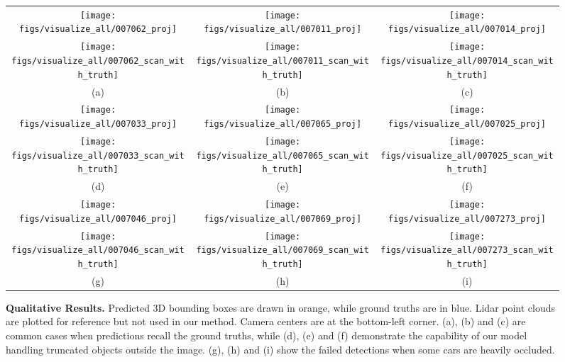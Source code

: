 \begin{figure*}[t] 
	\centering
	\scriptsize
	\begin{tabular}{c@{\hspace{0.14cm}}c@{\hspace{0.14cm}}c}
		\texttt{[image: figs/visualize\_all/007062\_proj]} &
		\texttt{[image: figs/visualize\_all/007011\_proj]} &
		\texttt{[image: figs/visualize\_all/007014\_proj]} \\
		\texttt{[image: figs/visualize\_all/007062\_scan\_with\_truth]} &
		\texttt{[image: figs/visualize\_all/007011\_scan\_with\_truth]} &
		\texttt{[image: figs/visualize\_all/007014\_scan\_with\_truth]} \\
		(a)  & (b)  & (c) \\
		
		\texttt{[image: figs/visualize\_all/007033\_proj]} &
		\texttt{[image: figs/visualize\_all/007065\_proj]} &
		\texttt{[image: figs/visualize\_all/007025\_proj]} \\
		\texttt{[image: figs/visualize\_all/007033\_scan\_with\_truth]} &
		\texttt{[image: figs/visualize\_all/007065\_scan\_with\_truth]} &
		\texttt{[image: figs/visualize\_all/007025\_scan\_with\_truth]} \\
		(d)  & (e)  & (f) \\
		
		\texttt{[image: figs/visualize\_all/007046\_proj]} &
		\texttt{[image: figs/visualize\_all/007069\_proj]} &
		\texttt{[image: figs/visualize\_all/007273\_proj]} \\
		\texttt{[image: figs/visualize\_all/007046\_scan\_with\_truth]} &
		\texttt{[image: figs/visualize\_all/007069\_scan\_with\_truth]} &
		\texttt{[image: figs/visualize\_all/007273\_scan\_with\_truth]} \\
		(g)  & (h)  & (i)
		
	\end{tabular}
	\caption{\textbf{Qualitative Results.} Predicted 3D bounding boxes are drawn in orange, while ground truths are in blue. Lidar point clouds are plotted for reference but not used in our method. Camera centers are at the bottom-left corner. (a), (b) and (c) are common cases when predictions recall the ground truths, while (d), (e) and (f) demonstrate the capability of our model handling truncated objects outside the image. (g), (h) and (i) show the failed detections when some cars are heavily occluded.}
	\label{fig:visualize3d}
\end{figure*}

